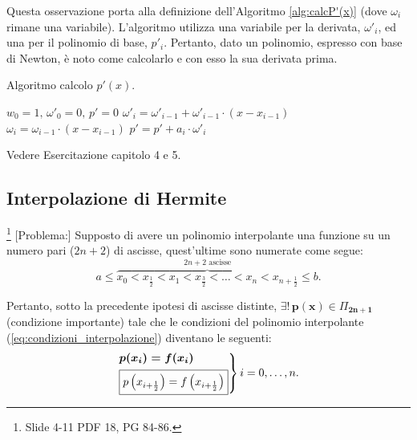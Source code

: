 Questa osservazione porta alla definizione dell'Algoritmo \ref{alg:calcP'(x)} (dove $\omega_i$ rimane una variabile). L'algoritmo utilizza una variabile per la derivata, $\omega'_i$, ed una per il polinomio di base, $p'_i$. Pertanto, dato un polinomio, espresso con base di Newton, è noto come calcolarlo e con esso la sua derivata prima.

\begin{algorithm}\caption{Algoritmo calcolo $p'(x)$.}\label{alg:calcP'(x)}
    \begin{algorithmic}
        \State $w_0=1,\, \omega'_0=0,\, p'=0$
            \State $\omega'_i=\omega'_{i-1}+\omega'_{i-1}\cdot (x-x_{i-1})$
            \State $\omega_i=\omega_{i-1}\cdot(x-x_{i-1})$
            \State $p'=p'+a_i\cdot\omega'_i$
        \EndFor
    \end{algorithmic}
\end{algorithm}

\begin{example}
	Vedere Esercitazione capitolo 4 e 5.
\end{example}

\subsection{Interpolazione di Hermite}\footnote{Slide 4-11 PDF 18, PG 84-86.}
[Problema:] Supposto di avere un polinomio interpolante una funzione su un numero pari ($2n+2$) di ascisse, quest'ultime sono numerate come segue:
\begin{equation}
    a\leq\overbrace{x_0 < x_{\frac{1}{2}} < x_1 < x_{\frac{3}{2}} < \hdots < x_n < x_{n+\frac{1}{2}}}^{2n+2\text{ ascisse}}\leq b.
\end{equation}

Pertanto, sotto la precedente ipotesi di ascisse distinte, $\boldsymbol{\exists!\, p(x)}\in\Pi_{\boldsymbol{2n+1}}$ (condizione importante) tale che le condizioni del polinomio interpolante (\ref{eq:condizioni_interpolazione}) diventano le seguenti:
\begin{equation}\label{eq:condizioni_polinomio_interpolazione_hermite}
    \begin{rcases}
        \boldsymbol{p(x_i)=f(x_i)}\\
        \boxed{p\left(x_{i+\frac{1}{2}}\right)=f\left(x_{i+\frac{1}{2}}\right)}
    \end{rcases} i=0,\hdots,n.
\end{equation}

